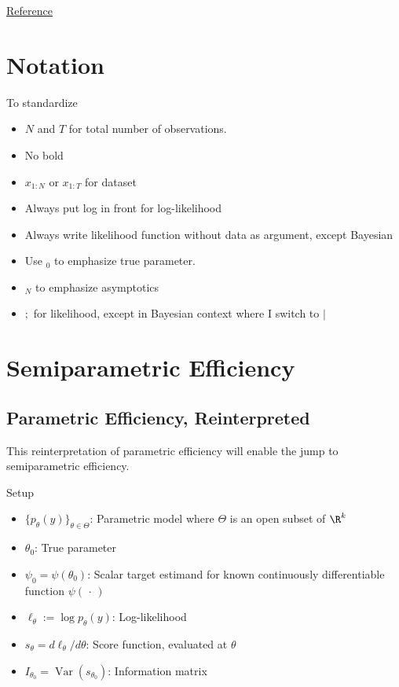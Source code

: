 \documentclass[12pt]{article}
\theoremstyle{plain}
\theoremstyle{definition}
\theoremstyle{remark}
\newcommand{\Var}{\operatorname{Var}}
\begin{document}
\href{http://www.stat.cmu.edu/~larry/=stat705/Lecture17.pdf}{Reference}








\clearpage
\section{Notation}

To standardize
\begin{itemize}
  \item $N$ and $T$ for total number of observations.
  \item No bold
  \item $x_{1:N}$ or $x_{1:T}$ for dataset
  \item Always put log in front for log-likelihood
  \item Always write likelihood function without data as argument,
    except Bayesian
  \item Use ${}_0$ to emphasize true parameter.
  \item ${}_N$ to emphasize asymptotics
  \item $;$ for likelihood, except in Bayesian context where I switch to
    $|$
\end{itemize}




\clearpage
\section{Semiparametric Efficiency}

\subsection{Parametric Efficiency, Reinterpreted}
This reinterpretation of parametric efficiency will enable the jump
to semiparametric efficiency.

Setup
\begin{itemize}
  \item  $\{p_\theta(y)\}_{\theta\in\Theta}$: Parametric model where
    $\Theta$ is an open subset of $\R^k$
  \item  $\theta_0$: True parameter
  \item $\psi_0=\psi(\theta_0)$: Scalar target estimand for known
    continuously differentiable function $\psi(\,\cdot\,)$
  \item $\ell_\theta:=\log p_\theta(y)$: Log-likelihood
  \item $s_\theta = d\ell_\theta/d\theta$:
    Score function, evaluated at $\theta$

  \item $I_{\theta_0}=\Var(s_{\theta_0})$:
    Information matrix
\end{itemize}
\end{document}
